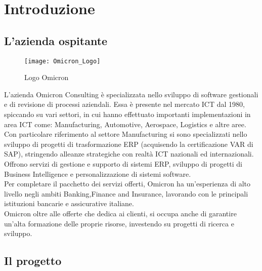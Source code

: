 \chapter{Introduzione}
\label{cap:introduzione}
\section{L'azienda ospitante}

\begin{figure}[!h] 
    \centering 
    \texttt{[image: Omicron\_Logo]} 
    \caption{Logo Omicron}
\end{figure}

\noindent L’azienda Omicron Consulting è specializzata nello sviluppo di software gestionali e di revisione di processi aziendali. Essa è presente nel mercato ICT dal 1980, spiccando su vari settori, in cui hanno effettuato importanti implementazioni in area ICT come: Manufacturing, Automotive, Aerospace, Logistics e altre aree.
Con particolare riferimento al settore Manufacturing si sono specializzati nello sviluppo di progetti di trasformazione ERP (acquisendo la certificazione VAR di SAP), stringendo alleanze strategiche con realtà ICT nazionali ed internazionali.\\
Offrono servizi di gestione e supporto di sistemi ERP, sviluppo di progetti di Business Intelligence e personalizzazione di sistemi software.\\
Per completare il pacchetto dei servizi offerti, Omicron ha un'esperienza di alto livello negli ambiti Banking,Finance and Insurance, lavorando con le principali istituzioni bancarie e assicurative italiane.\\
Omicron oltre alle offerte che dedica ai clienti, si occupa anche di garantire un'alta formazione delle proprie risorse, investendo su progetti di ricerca e sviluppo.

\section{Il progetto}

